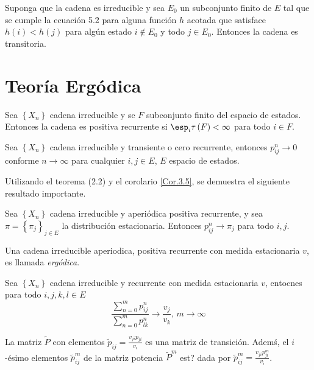 \begin{Prop}\label{Prop.5.4}
Suponga que la cadena es irreducible y sea $E_{0}$ un subconjunto finito de $E$ tal que se cumple la ecuaci\'on 5.2 para alguna funci\'on $h$ acotada que satisface $h\left(i\right)<h\left(j\right)$ para alg\'un estado $i\notin E_{0}$ y todo $j\in E_{0}$. Entonces la cadena es transitoria.
\end{Prop}

%
\section{Teor\'ia Erg\'odica}
%
\begin{Lema}
Sea $\left\{X_{n}\right\}$ cadena irreducible y se $F$ subconjunto finito del espacio de estados. Entonces la cadena es positiva recurrente si $\esp_{i}\tau\left(F\right)<\infty$ para todo $i\in F$.
\end{Lema}

\begin{Prop}
Sea $\left\{X_{n}\right\}$ cadena irreducible y transiente o cero recurrente, entonces $p_{ij}^{n}\rightarrow0$ conforme $n\rightarrow\infty$ para cualquier $i,j\in E$, $E$ espacio de estados.
\end{Prop}
Utilizando el teorema (2.2) y el corolario \ref{Cor.3.5}, se demuestra el siguiente resultado importante.

\begin{Teo}
Sea $\left\{X_{n}\right\}$ cadena irreducible y aperi\'odica positiva recurrente, y sea $\pi=\left\{\pi_{j}\right\}_{j\in E}$ la distribuci\'on estacionaria. Entonces $p_{ij}^{n}\rightarrow\pi_{j}$ para todo $i,j$.
\end{Teo}
\begin{Def}\label{Def.Ergodicidad}
Una cadena irreducible aperiodica, positiva recurrente con medida estacionaria $v$, es llamada {\em erg\'odica}.
\end{Def}

\begin{Prop}\label{Prop.4.4}
Sea $\left\{X_{n}\right\}$ cadena irreducible y recurrente con medida estacionaria $v$, entocnes para todo $i,j,k,l\in E$
\begin{equation}
\frac{\sum_{n=0}^{m}p_{ij}^{n}}{\sum_{n=0}^{m}p_{lk}^{n}}\rightarrow\frac{v_{j}}{v_{k}}\textrm{,    }m\rightarrow\infty
\end{equation}
\end{Prop}
\begin{Lema}\label{Lema.4.5}
La matriz $\widetilde{P}$ con elementos $\widetilde{p}_{ij}=\frac{v_{ji}p_{ji}}{v_{i}}$ es una matriz de transici\'on. Adem\'s, el $i$-\'esimo elementos $\widetilde{p}_{ij}^{m}$ de la matriz potencia $\widetilde{P}^{m}$ est? dada por $\widetilde{p}_{ij}^{m}=\frac{v_{ji}p_{ji}^{m}}{v_{i}}$.
\end{Lema}

